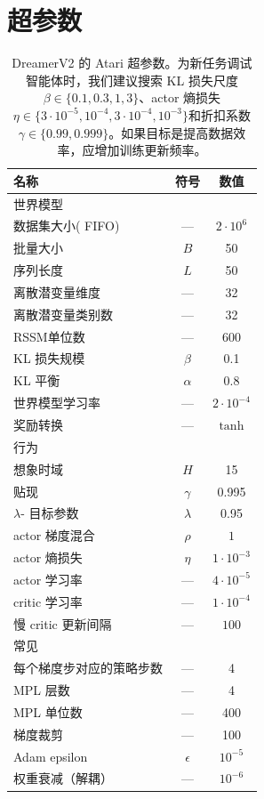 \clearpage

\section{超参数}

\begin{table}[h!]
\centering
\begin{tabular}{lcc}
\toprule
\textbf{名称} & \textbf{符号} & \textbf{数值} \\
\midrule
世界模型 \\
\midrule
数据集大小( FIFO)& --- & $2\cdot10^6$ \\
批量大小& $B$ & 50 \\
序列长度& $L$ & 50 \\
离散潜变量维度& --- & 32 \\
离散潜变量类别数& --- & 32 \\
RSSM单位数& --- & 600 \\
KL 损失规模& $\beta$ & 0.1 \\
KL 平衡& $\alpha$ & 0.8 \\
世界模型学习率& --- & $2\cdot10^{-4}$ \\
奖励转换& --- & $\operatorname{tanh}$ \\
\midrule
行为\\
\midrule
想象时域& $H$ & 15 \\
贴现& $\gamma$ & 0.995 \\
$\lambda$- 目标参数& $\lambda$ & 0.95 \\
actor 梯度混合& $\rho$ & $1$ \\
actor 熵损失& $\eta$ & $1\cdot10^{-3}$ \\
actor 学习率& --- & $4\cdot10^{-5}$ \\
critic 学习率& --- & $1\cdot10^{-4}$ \\
慢 critic 更新间隔& --- & $100$ \\
\midrule
常见\\
\midrule
每个梯度步对应的策略步数& --- & 4 \\
MPL 层数& --- & 4 \\
MPL 单位数& --- & 400 \\
梯度裁剪& --- & 100 \\
Adam epsilon& $\epsilon$ & $10^{-5}$ \\
权重衰减（解耦）& --- & $10^{-6}$ \\
\bottomrule
\end{tabular}
\caption{DreamerV2 的 Atari 超参数。为新任务调试智能体时，我们建议搜索 KL 损失尺度$\beta \in \{0.1,0.3,1,3\}$、actor 熵损失$\eta \in \{3\cdot10^{-5},10^{-4},3\cdot10^{-4},10^{-3}\}$和折扣系数$\gamma \in \{0.99,0.999\}$。如果目标是提高数据效率，应增加训练更新频率。}
\label{tab:hparams}
\end{table}
